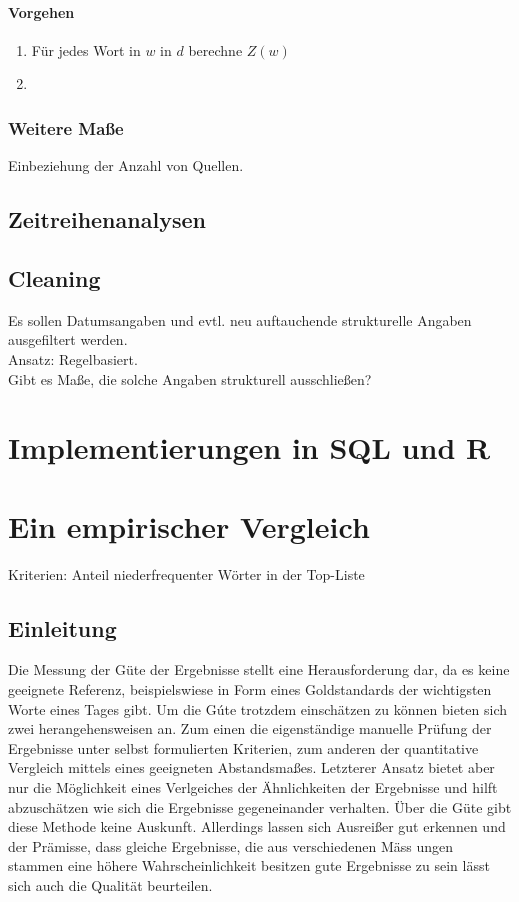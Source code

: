 \subsubsection{Vorgehen}
\begin{enumerate}
	\item Für jedes Wort in $w$ in $d$ berechne $Z(w)$
	\item 
\end{enumerate}




\subsection{Weitere Maße}
Einbeziehung der Anzahl von Quellen.

\section{Zeitreihenanalysen}
\section{Cleaning}
Es sollen Datumsangaben und evtl. neu auftauchende strukturelle Angaben ausgefiltert werden.\\
Ansatz: Regelbasiert.\\
Gibt es Maße, die solche Angaben strukturell ausschließen?


\chapter{Implementierungen in SQL und R}
\chapter{Ein empirischer Vergleich}
 
Kriterien: Anteil niederfrequenter Wörter in der Top-Liste\\
\section{Einleitung}
Die Messung der G\"ute der Ergebnisse stellt eine Herausforderung dar, da es keine geeignete Referenz, beispielswiese in Form eines Goldstandards der wichtigsten Worte eines Tages gibt. Um die G\'ute trotzdem einsch\"atzen zu k\"onnen bieten sich zwei herangehensweisen an. Zum einen die eigenst\"andige manuelle Pr\"ufung der Ergebnisse unter selbst formulierten Kriterien, zum anderen der quantitative Vergleich mittels eines geeigneten Abstandsma\ss es. Letzterer Ansatz bietet aber nur die M\"oglichkeit eines Verlgeiches der \"Ahnlichkeiten der Ergebnisse und hilft abzusch\"atzen wie sich die Ergebnisse gegeneinander verhalten. \"Uber die G\"ute gibt diese Methode keine Auskunft. Allerdings lassen sich Ausrei\ss er gut erkennen und der Pr\"amisse, dass gleiche Ergebnisse, die aus verschiedenen M\"ass ungen stammen eine h\"ohere Wahrscheinlichkeit besitzen gute Ergebnisse zu sein l\"asst sich auch die Qualit\"at beurteilen.
